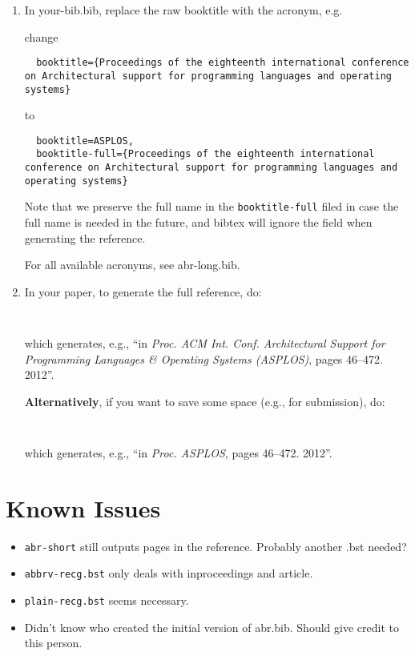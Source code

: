 \documentclass[letterpaper,11pt]{article}
\begin{document}
\begin{enumerate}
\item 
In your-bib.bib, replace the raw booktitle with the acronym, e.g.

change

\begin{lstlisting}
  booktitle={Proceedings of the eighteenth international conference on Architectural support for programming languages and operating systems}
\end{lstlisting}  

to 

\begin{lstlisting}
  booktitle=ASPLOS,
  booktitle-full={Proceedings of the eighteenth international conference on Architectural support for programming languages and operating systems}  
\end{lstlisting}  

Note that we preserve the full name in the \texttt{booktitle-full} filed in case the full name is needed in the future, and bibtex will ignore the field when generating the reference.

For all available acronyms, see abr-long.bib.

\item 
In your paper, to generate the full reference, do:

\begin{lstlisting}


\end{lstlisting}

which generates, e.g., ``in \emph{Proc. ACM Int. Conf. Architectural Support for Programming Languages \& Operating Systems (ASPLOS)}, pages 46--472. 2012''.

\textbf{Alternatively}, if you want to save some space (e.g., for submission), do:
\begin{lstlisting}


\end{lstlisting}

which generates, e.g., ``in \emph{Proc. ASPLOS}, pages 46--472. 2012''.

\end{enumerate}


  

\section{Known Issues}

\begin{itemize}
\item 
	\texttt{abr-short} still outputs pages in the reference. Probably another .bst needed?
\item 
	\texttt{abbrv-recg.bst} only deals with inproceedings and article. 
\item 
	\texttt{plain-recg.bst} seems necessary.
\item 
	Didn't know who created the initial version of abr.bib. Should give credit to this person. 
\end{itemize}


%
%


%

\end{document}
